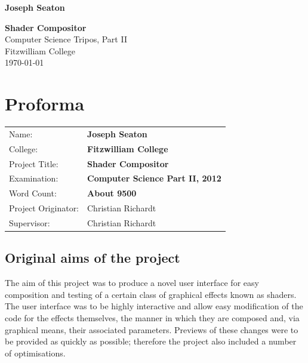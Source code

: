 \documentclass[12pt,twoside,notitlepage]{report}
\begin{document}


\newcommand{\name}{Joseph Seaton}
\newcommand{\college}{Fitzwilliam College}
\newcommand{\ptitle}{Shader Compositor}

\setcounter{page}{1}
\pagestyle{plain}



\pagestyle{empty}

\hfill{\LARGE \bf \name}

\vspace*{60mm}
\begin{center}
\Huge
{\bf \ptitle} \\
\vspace*{5mm}
Computer Science Tripos, Part II\\
\vspace*{5mm}
\college \\
\vspace*{5mm}
\today  %
\end{center}

\cleardoublepage




\section*{Proforma}

{
\begin{tabular}{@{\hspace{0em}}ll}
Name:               & \bf \name    \\
College:            & \bf \college \\
Project Title:      & \bf \ptitle  \\
Examination:        & \bf Computer Science Part II, 2012\\
Word Count:         & \bf About 9500 \\
Project Originator: & Christian Richardt                    \\
Supervisor:         & Christian Richardt                    \\ 
\end{tabular}
}


\subsection*{Original aims of the project}
The aim of this project was to produce a novel user interface for easy composition and testing of a certain class of graphical effects known as shaders. The user interface was to be highly interactive and allow easy modification of the code for the effects themselves, the manner in which they are composed and, via graphical means, their associated parameters. Previews of these changes were to be provided as quickly as possible; therefore the project also included a number of optimisations.
\end{document}
